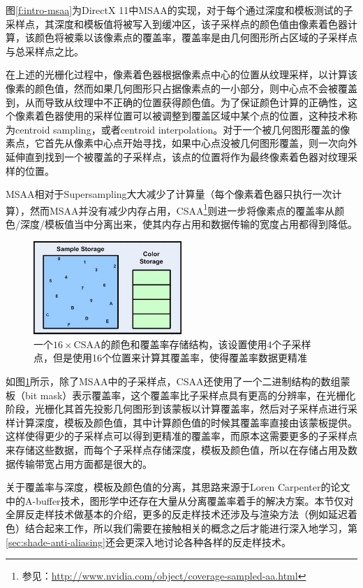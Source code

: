 图\ref{f:intro-msaa}为DirectX 11中MSAA的实现，对于每个通过深度和模板测试的子采样点，其深度和模板值将被写入到缓冲区，该子采样点的颜色值由像素着色器计算，该颜色将被乘以该像素点的覆盖率，覆盖率是由几何图形所占区域的子采样点与总采样点之比。

在上述的光栅化过程中，像素着色器根据像素点中心的位置从纹理采样，以计算该像素的颜色值，然而如果几何图形只占据像素点的一小部分，则中心点不会被覆盖到，从而导致从纹理中不正确的位置获得颜色值。为了保证颜色计算的正确性，这个像素着色器使用的采样位置可以被调整到覆盖区域中某个点的位置，这种技术称为centroid sampling，或者centroid interpolation。对于一个被几何图形覆盖的像素点，它首先从像素中心点开始寻找，如果中心点没被几何图形覆盖，则一次向外延伸直到找到一个被覆盖的子采样点，该点的位置将作为最终像素着色器对纹理采样的位置。

MSAA相对于Supersampling大大减少了计算量（每个像素着色器只执行一次计算），然而MSAA并没有减少内存占用，CSAA\footnote{参见：\url{http://www.nvidia.com/object/coverage-sampled-aa.html}}则进一步将像素点的覆盖率从颜色/深度/模板值当中分离出来，使其内存占用和数据传输的宽度占用都得到降低。

\begin{figure}
\sidecaption
	\includegraphics[width=0.5\textwidth]{figures/intro/sample_coverage}
	\caption{一个$16\times$CSAA的颜色和覆盖率存储结构，该设置使用4个子采样点，但是使用16个位置来计算其覆盖率，使得覆盖率数据更精准}
	\label{f:intro-sample-coverage}
\end{figure}

如图\ref{f:intro-sample-coverage}所示，除了MSAA中的子采样点，CSAA还使用了一个二进制结构的数组蒙板（bit mask）表示覆盖率，这个覆盖率比子采样点具有更高的分辨率，在光栅化阶段，光栅化其首先投影几何图形到该蒙板以计算覆盖率，然后对子采样点进行采样计算深度，模板及颜色值，其中计算颜色值的时候其覆盖率直接由该蒙板提供。这样使得更少的子采样点可以得到更精准的覆盖率，而原本这需要更多的子采样点来存储这些数据，而每个子采样点存储深度，模板及颜色值，所以在存储占用及数据传输带宽占用方面都是很大的。

关于覆盖率与深度，模板及颜色值的分离，其思路来源于Loren Carpenter的论文\cite{a:TheA-bufferanAntialiasedHiddenSurfaceMethod}中的A-buffer技术，图形学中还存在大量从分离覆盖率着手的解决方案。本节仅对全屏反走样技术做基本的介绍，更多的反走样技术还涉及与渲染方法（例如延迟着色）结合起来工作，所以我们需要在接触相关的概念之后才能进行深入地学习，第\ref{sec:shade-anti-aliasing}还会更深入地讨论各种各样的反走样技术。






